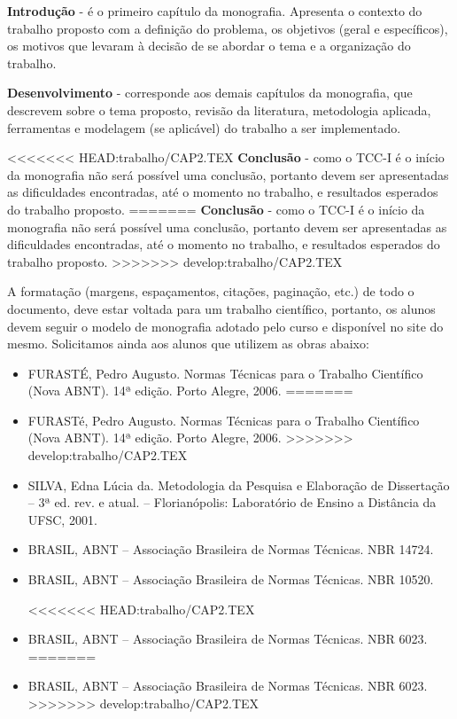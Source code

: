 \textbf{Introdução} - \'e o primeiro capítulo da monografia. Apresenta o contexto do trabalho proposto com a definição do problema, os objetivos (geral e específicos), os motivos que levaram à decisão de se abordar o tema e a organização do trabalho.

\textbf{Desenvolvimento} - corresponde aos demais capítulos da monografia, que descrevem sobre o tema proposto, revisão da literatura, metodologia aplicada, ferramentas e modelagem (se aplicável) do trabalho a ser implementado.

<<<<<<< HEAD:trabalho/CAP2.TEX
\textbf{Conclusão} - como o TCC-I é o início da monografia não será possível uma conclusão, portanto devem ser apresentadas as dificuldades encontradas, até o momento no trabalho, e resultados esperados do trabalho proposto.
=======
\textbf{Conclusão} - como o TCC-I \'e o início da monografia não será possível uma conclusão, portanto devem ser apresentadas as dificuldades encontradas, at\'e o momento no trabalho, e resultados esperados do trabalho proposto.
>>>>>>> develop:trabalho/CAP2.TEX

A formatação (margens, espaçamentos, citações, paginação, etc.) de todo o documento, deve estar voltada para um trabalho científico, portanto, 
os alunos devem seguir o modelo de monografia adotado pelo curso e disponível no site do mesmo. 
Solicitamos ainda aos alunos que utilizem as obras abaixo:

	\begin{itemize}	
<<<<<<< HEAD:trabalho/CAP2.TEX
		\item  FURASTÉ, Pedro Augusto. Normas Técnicas para o Trabalho Científico (Nova ABNT). 14ª edição. Porto Alegre, 2006.
=======
		\item  FURAST\'e, Pedro Augusto. Normas T\'ecnicas para o Trabalho Científico (Nova ABNT). 14ª edição. Porto Alegre, 2006.
>>>>>>> develop:trabalho/CAP2.TEX

		\item SILVA, Edna Lúcia da. Metodologia da Pesquisa e Elaboração de Dissertação – 3ª ed. rev. e atual. – Florianópolis: Laboratório de Ensino a Distância da 			UFSC, 2001.

		\item BRASIL, ABNT – Associação Brasileira de Normas T\'ecnicas. NBR 14724.

		\item BRASIL, ABNT – Associação Brasileira de Normas T\'ecnicas. NBR 10520.

<<<<<<< HEAD:trabalho/CAP2.TEX
		\item BRASIL, ABNT – Associação Brasileira de Normas Técnicas. NBR 6023.
=======
		\item BRASIL, ABNT – Associação Brasileira de Normas T\'ecnicas. NBR 6023.
>>>>>>> develop:trabalho/CAP2.TEX
	\end{itemize}
	

